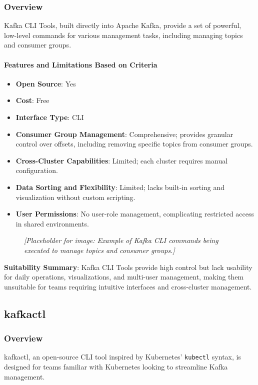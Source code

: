 \documentclass[10pt , a4paper]{report}
\begin{document}
\subsubsection*{Overview} 
Kafka CLI Tools, built directly into Apache Kafka, provide a set of powerful, low-level commands for various management tasks, including managing topics and consumer groups.

\paragraph{Features and Limitations Based on Criteria}
\begin{itemize} 
    \item \small \textbf{Open Source}: Yes
    \item \small \textbf{Cost}: Free
    \item \small \textbf{Interface Type}: CLI
    \item \small \textbf{Consumer Group Management}: Comprehensive; provides granular control over offsets, including removing specific topics from consumer groups.
    \item \small \textbf{Cross-Cluster Capabilities}: Limited; each cluster requires manual configuration.
    \item \small \textbf{Data Sorting and Flexibility}: Limited; lacks built-in sorting and visualization without custom scripting.
    \item \small \textbf{User Permissions}: No user-role management, complicating restricted access in shared environments.
\end{itemize}

\begin{figure}[h] 
\centering 
\textit{[Placeholder for image: Example of Kafka CLI commands being executed to manage topics and consumer groups.]} 
\end{figure}

\textbf{Suitability Summary}: Kafka CLI Tools provide high control but lack usability for daily operations, visualizations, and multi-user management, making them unsuitable for teams requiring intuitive interfaces and cross-cluster management.

\subsection{kafkactl} 
\subsubsection*{Overview} 
kafkactl, an open-source CLI tool inspired by Kubernetes’ \texttt{kubectl} syntax, is designed for teams familiar with Kubernetes looking to streamline Kafka management.
\end{document}
